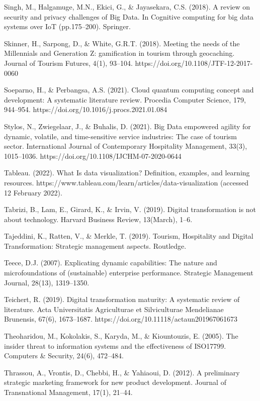 \documentclass[
  letterpaper,
  DIV=11,
  numbers=noendperiod]{scrreprt}
\begin{document}
Singh, M., Halgamuge, M.N., Ekici, G., \& Jayasekara, C.S. (2018). A
review on security and privacy challenges of Big Data. In Cognitive
computing for big data systems over IoT (pp.175--200). Springer.

Skinner, H., Sarpong, D., \& White, G.R.T. (2018). Meeting the needs of
the Millennials and Generation Z: gamification in tourism through
geocaching. Journal of Tourism Futures, 4(1), 93--104.
https://doi.org/10.1108/JTF-12-2017-0060

Soeparno, H., \& Perbangsa, A.S. (2021). Cloud quantum computing concept
and development: A systematic literature review. Procedia Computer
Science, 179, 944--954. https://doi.org/10.1016/j.procs.2021.01.084

Stylos, N., Zwiegelaar, J., \& Buhalis, D. (2021). Big Data empowered
agility for dynamic, volatile, and time-sensitive service industries:
The case of tourism sector. International Journal of Contemporary
Hospitality Management, 33(3), 1015--1036.
https://doi.org/10.1108/IJCHM-07-2020-0644

Tableau. (2022). What Is data visualization? Definition, examples, and
learning resources.
https://www.tableau.com/learn/articles/data-visualization (accessed 12
February 2022).

Tabrizi, B., Lam, E., Girard, K., \& Irvin, V. (2019). Digital
transformation is not about technology. Harvard Business Review,
13(March), 1--6.

Tajeddini, K., Ratten, V., \& Merkle, T. (2019). Tourism, Hospitality
and Digital Transformation: Strategic management aspects. Routledge.

Teece, D.J. (2007). Explicating dynamic capabilities: The nature and
microfoundations of (sustainable) enterprise performance. Strategic
Management Journal, 28(13), 1319--1350.

Teichert, R. (2019). Digital transformation maturity: A systematic
review of literature. Acta Universitatis Agriculturae et Silviculturae
Mendelianae Brunensis, 67(6), 1673--1687.
https://doi.org/10.11118/actaun201967061673

Theoharidou, M., Kokolakis, S., Karyda, M., \& Kiountouzis, E. (2005).
The insider threat to information systems and the effectiveness of
ISO17799. Computers \& Security, 24(6), 472--484.

Thrassou, A., Vrontis, D., Chebbi, H., \& Yahiaoui, D. (2012). A
preliminary strategic marketing framework for new product development.
Journal of Transnational Management, 17(1), 21--44.
\end{document}
